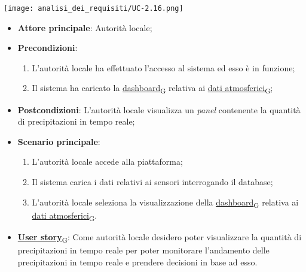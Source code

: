 \begin{center}
	\texttt{[image: analisi\_dei\_requisiti/UC-2.16.png]}
\end{center}

\begin{itemize}
	\item \textbf{Attore principale}: Autorità locale;
	\item \textbf{Precondizioni}:
	      \begin{enumerate}
		      \item L'autorità locale ha effettuato l'accesso al sistema ed esso è in funzione;
		      \item Il sistema ha caricato la \href{https://7last.github.io/docs/rtb/documentazione-interna/glossario\#dashboard}{dashboard\textsubscript{G}} relativa ai \href{https://7last.github.io/docs/rtb/documentazione-interna/glossario\#dati-atmosferici}{dati atmosferici\textsubscript{G}};
	      \end{enumerate}

	\item \textbf{Postcondizioni}: L'autorità locale visualizza un \textit{panel} contenente la quantità di precipitazioni in tempo reale;
	\item \textbf{Scenario principale}:
	      \begin{enumerate}
		      \item L'autorità locale accede alla piattaforma;
		      \item Il sistema carica i dati relativi ai sensori interrogando il database;
		      \item L'autorità locale seleziona la visualizzazione della \href{https://7last.github.io/docs/rtb/documentazione-interna/glossario\#dashboard}{dashboard\textsubscript{G}} relativa ai \href{https://7last.github.io/docs/rtb/documentazione-interna/glossario\#dati-atmosferici}{dati atmosferici\textsubscript{G}}.
	      \end{enumerate}
	\item \href{https://7last.github.io/docs/rtb/documentazione-interna/glossario\#user-story}{\textbf{User story}\textsubscript{G}}: Come autorità locale desidero poter visualizzare la quantità di precipitazioni in tempo reale per poter monitorare
	      l'andamento delle precipitazioni in tempo reale e prendere decisioni in base ad esso.
\end{itemize}

